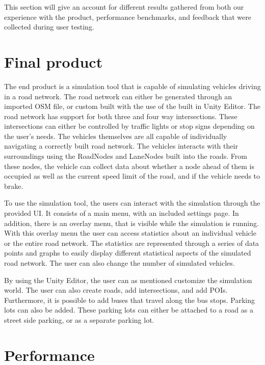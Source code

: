 
This section will give an account for different results gathered from both our experience with the product, performance benchmarks, and feedback that were collected during user testing. 

\section{Final product}
    The end product is a simulation tool that is capable of simulating vehicles driving in a road network. The road network can either be generated through an imported OSM file, or custom built with the use of the built in Unity Editor. The road network has support for both three and four way intersections. These intersections can either be controlled by traffic lights or stop signs depending on the user's needs. The vehicles themselves are all capable of individually navigating a correctly built road network. The vehicles interacts with their surroundings using the RoadNodes and LaneNodes built into the roads. From these nodes, the vehicle can collect data about whether a node ahead of them is occupied as well as the current speed limit of the road, and if the vehicle needs to brake.

    To use the simulation tool, the users can interact with the simulation through the provided UI. It consists of a main menu, with an included settings page. In addition, there is an overlay menu, that is visible while the simulation is running. With this overlay menu the user can access statistics about an individual vehicle or the entire road network. The statistics are represented through a series of data points and graphs to easily display different statistical aspects of the simulated road network. The user can also change the number of simulated vehicles.

    By using the Unity Editor, the user can as mentioned customize the simulation world. The user can also create roads, add intersections, and add POIs. Furthermore, it is possible to add buses that travel along the bus stops. Parking lots can also be added. These parking lots can either be attached to a road as a street side parking, or as a separate parking lot.

\section{Performance} \label{performance-benchmark}
    

